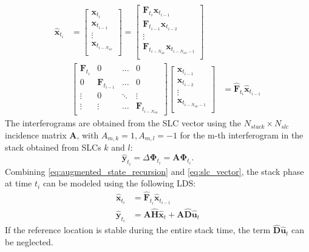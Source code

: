\documentclass{article}
\begin{document}
\begin{equation}\label{eq:augmented_state_recursion}
	\begin{aligned}
	\hat{\mathbf{x}}_{t_i} &= 
	\begin{bmatrix}
		\mathbf{x}_{t_{i}}\\
		\mathbf{x}_{t_{i-1}}\\
		\vdots\\
		\mathbf{x}_{t_{i-N_{slc}}}\\
	\end{bmatrix}
	=
	\begin{bmatrix}
		\mathbf{F}_{t_{i}}\mathbf{x}_{t_{i-1}}\\
		\mathbf{F}_{t_{i-1}}\mathbf{x}_{t_{i-2}}\\
		\vdots\\
		\mathbf{F}_{t_{i-{N_{slc}}}}\mathbf{x}_{t_{i-N_{slc} -1}}\\
	\end{bmatrix}\\
	&\begin{bmatrix}
	\mathbf{F}_{t_i} & 0 & \dots & 0\\
	0 & \mathbf{F}_{t_{i-1}} & \dots & 0\\
	\vdots & 0 & \ddots & \vdots\\
	\vdots & \vdots &  \dots & \mathbf{F}_{t_{i-{N_{slc}}}}
	\end{bmatrix} 
	\begin{bmatrix}
			\mathbf{x}_{t_{i-1}}\\
			\mathbf{x}_{t_{i-2}}\\
			\vdots\\
			\mathbf{x}_{t_{i-N_{slc} -1}}\\
	\end{bmatrix} &= \hat{\mathbf{F}}_{t_i} \hat{\mathbf{x}}_{t_{i-1}}
	\end{aligned}
\end{equation}
The interferograms  are obtained from the SLC vector using the  $N_{stack}\times N_{slc}$ incidence matrix $\mathbf{A}$, with $A_{m,k} = 1, A_{m,l}=-1$ for the m-th interferogram in the stack obtained from SLCs $k$ and $l$\cite{Agram2015}:
\begin{equation}
	\hat{\mathbf{y}}_{t_i} = \Delta\mathbf{\Phi}_{t_i} = \mathbf{A} \mathbf{\Phi}_{t_i}.
\end{equation}
Combining \autoref{eq:augmented_state_recursion} and \autoref{eq:slc_vector}, the stack phase at time $t_i$ can be  modeled using the following LDS:
\begin{equation}\label{eq:state_recursion}
	\begin{aligned}
		 \hat{\mathbf{x}}_{t_i} &= \hat{\mathbf{F}}_{t_i} \hat{\mathbf{x}}_{t_{i-1}}\\
		\hat{\mathbf{y}}_{t_i} &= \mathbf{A}\hat{\mathbf{H}} \hat{\mathbf{x}}_{t} + \mathbf{A}\hat{\mathbf{D}} \hat{\mathbf{u}}_{t}
	\end{aligned}
\end{equation}
If the reference location is stable during the entire stack time, the term  $\hat{\mathbf{D}}\hat{\mathbf{u}}_{t}$ can be neglected.
\end{document}

